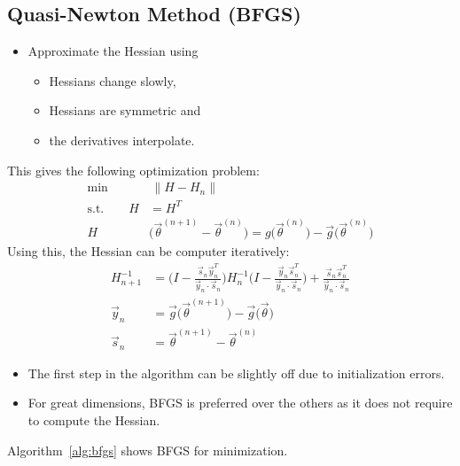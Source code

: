 		\subsection{Quasi-Newton Method (BFGS)}
			\begin{itemize}
				\item Approximate the Hessian using
					\begin{itemize}
						\item Hessians change slowly,
						\item Hessians are symmetric and
						\item the derivatives interpolate.
					\end{itemize}
			\end{itemize}
			This gives the following optimization problem:
			\begin{align}
				\min \,&\, \lVert H - H_n \rVert \\
				\textrm{s.t.} \qquad
				H & = H^T \\
				H & \big(\vec{\theta}^{(n + 1)} - \vec{\theta}^{(n)}\big) = g\big(\vec{\theta}^{(n)}\big) - \vec{g}\big(\vec{\theta}^{(n)}\big)
			\end{align}
			Using this, the Hessian can be computer iteratively:
			\begin{align}
				H_{n + 1}^{-1} &= \Bigg( I - \frac{\vec{s}_n \vec{y}_n^T}{\vec{y}_n \cdot \vec{s}_n} \Bigg) H_n^{-1}
				                  \Bigg( I - \frac{\vec{y}_n \vec{s}_n^T}{\vec{y}_n \cdot \vec{s}_n} \Bigg)
				                + \frac{\vec{s}_n \vec{s}_n^T}{\vec{y}_n \cdot \vec{s}_n} \\
				\vec{y}_n &= \vec{g}\big(\vec{\theta}^{(n + 1)}\big) - \vec{g}\big(\vec{\theta}\big) \\
				\vec{s}_n &= \vec{\theta}^{(n + 1)} - \vec{\theta}^{(n)}
			\end{align}

			\begin{itemize}
				\item The first step in the algorithm can be slightly off due to initialization errors.
				\item For great dimensions, BFGS is preferred over the others as it does not require to compute the Hessian.
			\end{itemize}

			Algorithm~\ref{alg:bfgs} shows BFGS for minimization.

